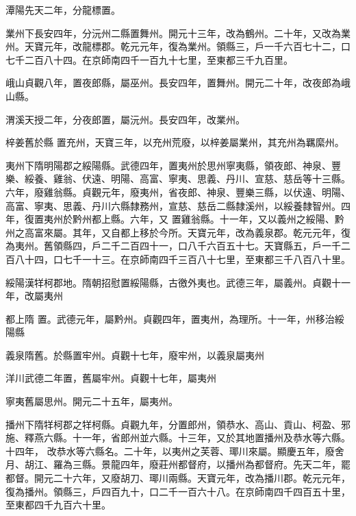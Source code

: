 \begin{pinyinscope}
 潭陽先天二年，分龍標置。



 業州下長安四年，分沅州二縣置舞州。開元十三年，改為鶴州。二十年，又改為業州。天寶元年，改龍標郡。乾元元年，復為業州。領縣三，戶一千六百七十二，口七千二百八十四。在京師南四千一百九十七里，至東都三千九百里。



 峨山貞觀八年，置夜郎縣，屬巫州。長安四年，置舞州。開元二十年，改夜郎為峨山縣。



 渭溪天授二年，分夜郎置，屬沅州。長安四年，改業州。



 梓姜舊於縣
 置充州，天寶三年，以充州荒廢，以梓姜屬業州，其充州為羈縻州。



 夷州下隋明陽郡之綏陽縣。武德四年，置夷州於思州寧夷縣，領夜郎、神泉、豐樂、綏養、雞翁、伏遠、明陽、高富、寧夷、思義、丹川、宣慈、慈岳等十三縣。六年，廢雞翁縣。貞觀元年，廢夷州，省夜郎、神泉、豐樂三縣，以伏遠、明陽、高富、寧夷、思義、丹川六縣隸務州，宣慈、慈岳二縣隸溪州，以綏養隸智州。四年，復置夷州於黔州都上縣。六年，又
 置雞翁縣。十一年，又以義州之綏陽、黔州之高富來屬。其年，又自都上移於今所。天寶元年，改為義泉郡。乾元元年，復為夷州。舊領縣四，戶二千二百四十一，口八千六百五十七。天寶縣五，戶一千二百八十四，口七千一十三。在京師南四千三百八十七里，至東都三千八百八十里。



 綏陽漢䍧柯郡地。隋朝招慰置綏陽縣，古徼外夷也。武德三年，屬義州。貞觀十一年，改屬夷州



 都上隋
 置。武德元年，屬黔州。貞觀四年，置夷州，為理所。十一年，州移治綏陽縣



 義泉隋舊。於縣置牢州。貞觀十七年，廢牢州，以義泉屬夷州



 洋川武德二年置，舊屬牢州。貞觀十七年，屬夷州



 寧夷舊屬思州。開元二十五年，屬夷州。



 播州下隋䍧柯郡之䍧柯縣。貞觀九年，分置郎州，領恭水、高山、貢山、柯盈、邪施、釋燕六縣。十一年，省郎州並六縣。十三年，又於其地置播州及恭水等六縣。十四年，
 改恭水等六縣名。二十年，以夷州之芙蓉、瑘川來屬。顯慶五年，廢舍月、胡江、羅為三縣。景龍四年，廢莊州都督府，以播州為都督府。先天二年，罷都督。開元二十六年，又廢胡刀、瑘川兩縣。天寶元年，改為播川郡。乾元元年，復為播州。領縣三，戶四百九十，口二千一百六十八。在京師南四千四百五十里，至東都四千九百六十里。




\end{pinyinscope}
